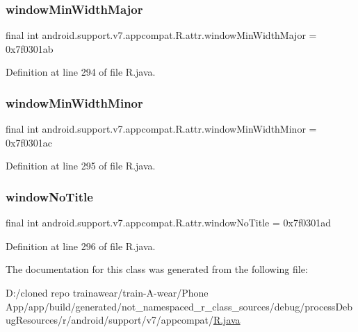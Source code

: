 \subsubsection{\texorpdfstring{windowMinWidthMajor}{windowMinWidthMajor}}
{\footnotesize\ttfamily final int android.\+support.\+v7.\+appcompat.\+R.\+attr.\+window\+Min\+Width\+Major = 0x7f0301ab\hspace{0.3cm}{\ttfamily [static]}}



Definition at line 294 of file R.\+java.

\mbox{\label{classandroid_1_1support_1_1v7_1_1appcompat_1_1_r_1_1attr_a42559736432f294a82fae05e842c36f6}} 
\subsubsection{\texorpdfstring{windowMinWidthMinor}{windowMinWidthMinor}}
{\footnotesize\ttfamily final int android.\+support.\+v7.\+appcompat.\+R.\+attr.\+window\+Min\+Width\+Minor = 0x7f0301ac\hspace{0.3cm}{\ttfamily [static]}}



Definition at line 295 of file R.\+java.

\mbox{\label{classandroid_1_1support_1_1v7_1_1appcompat_1_1_r_1_1attr_a46ea84cd8ac398f0d99f1ff7f0e2d100}} 
\subsubsection{\texorpdfstring{windowNoTitle}{windowNoTitle}}
{\footnotesize\ttfamily final int android.\+support.\+v7.\+appcompat.\+R.\+attr.\+window\+No\+Title = 0x7f0301ad\hspace{0.3cm}{\ttfamily [static]}}



Definition at line 296 of file R.\+java.



The documentation for this class was generated from the following file\+:\begin{DoxyCompactItemize}
\item 
D\+:/cloned repo trainawear/train-\/\+A-\/wear/\+Phone App/app/build/generated/not\+\_\+namespaced\+\_\+r\+\_\+class\+\_\+sources/debug/process\+Debug\+Resources/r/android/support/v7/appcompat/\mbox{\hyperlink{process_debug_resources_2r_2android_2support_2v7_2appcompat_2_r_8java}{R.\+java}}\end{DoxyCompactItemize}
